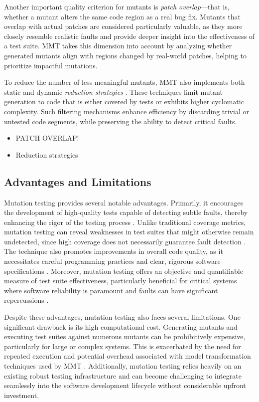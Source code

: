 \documentclass[12pt,a4paper]{article}
\begin{document}
Another important quality criterion for mutants is \textit{patch overlap}—that is,
whether a mutant alters the same code region as a real bug fix. Mutants that
overlap with actual patches are considered particularly valuable, as they more
closely resemble realistic faults and provide deeper insight into the
effectiveness of a test suite. MMT takes this dimension into account by
analyzing whether generated mutants align with regions changed by real-world
patches, helping to prioritize impactful mutations.

To reduce the number of less meaningful mutants, MMT also implements both
static and dynamic \textit{reduction strategies} \cite{bockisch_mutation_2024}. These
techniques limit mutant generation to code that is either covered by tests or
exhibits higher cyclomatic complexity. Such filtering mechanisms enhance
efficiency by discarding trivial or untested code segments, while preserving
the ability to detect critical faults.

\begin{itemize}
	\item PATCH OVERLAP!
	\item Reduction strategies
\end{itemize}

\subsection{Advantages and Limitations}

Mutation testing provides several notable advantages. Primarily, it
encourages the development of high-quality tests capable of detecting subtle
faults, thereby enhancing the rigor of the testing process
\cite{jia_analysis_2011}. Unlike traditional coverage metrics, mutation
testing can reveal weaknesses in test suites that might otherwise remain
undetected, since high coverage does not necessarily guarantee fault
detection \cite{jia_analysis_2011, bockisch_mmt_2024}. The technique also
promotes improvements in overall code quality, as it necessitates careful
programming practices and clear, rigorous software specifications
\cite{offutt_mutation_2001}. Moreover, mutation testing offers an objective
and quantifiable measure of test suite effectiveness, particularly beneficial
for critical systems where software reliability is paramount and faults can
have significant repercussions \cite{offutt_mutation_2001,jia_analysis_2011}.

Despite these advantages, mutation testing also faces several limitations.
One significant drawback is its high computational cost. Generating mutants
and executing test suites against numerous mutants can be prohibitively
expensive, particularly for large or complex systems. This is exacerbated by
the need for repeated execution and potential overhead associated with model
transformation techniques used by MMT \cite{bockisch_mutation_2024}.
Additionally, mutation testing relies heavily on an existing robust testing
infrastructure and can become challenging to integrate seamlessly into the
software development lifecycle without considerable upfront investment.
\end{document}
